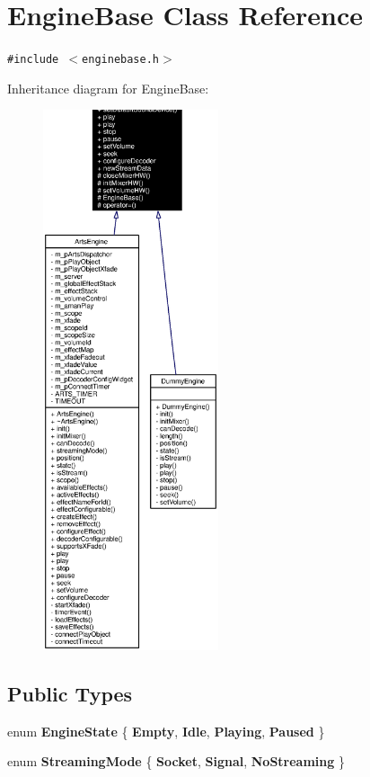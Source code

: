 \section{Engine\-Base Class Reference}
\label{classEngineBase}
{\tt \#include $<$enginebase.h$>$}

Inheritance diagram for Engine\-Base:\begin{figure}[H]
\begin{center}
\leavevmode
\includegraphics[width=146pt]{classEngineBase__inherit__graph}
\end{center}
\end{figure}
\subsection*{Public Types}
\begin{CompactItemize}
\item 
enum {\bf Engine\-State} \{ {\bf Empty}, 
{\bf Idle}, 
{\bf Playing}, 
{\bf Paused}
 \}
\item 
enum {\bf Streaming\-Mode} \{ {\bf Socket}, 
{\bf Signal}, 
{\bf No\-Streaming}
 \}
\end{CompactItemize}
